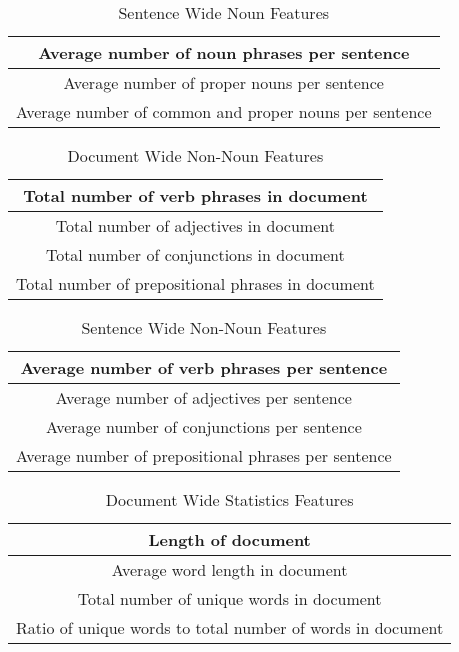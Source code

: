\documentclass[]{article}
\begin{document}
\begin{table}[!htbp]
	\begin{center}
		\begin{tabular}{| c |} \hline
      Average number of noun phrases per sentence \\ \hline
			Average number of proper nouns per sentence \\ \hline
			Average number of common and proper nouns per sentence \\ \hline
		\end{tabular}
	\end{center}
	\caption{Sentence Wide Noun Features}
	\label{table:group2}
\end{table}

\begin{table}[!htbp]
	\begin{center}
		\begin{tabular}{| c |} \hline
			Total number of verb phrases in document \\ \hline
			Total number of adjectives in document \\ \hline
			Total number of conjunctions in document \\ \hline
			Total number of prepositional phrases in document \\ \hline
		\end{tabular}
	\end{center}
	\caption{Document Wide Non-Noun Features}
	\label{table:group3}
\end{table}

\begin{table}[!htbp]
	\begin{center}
		\begin{tabular}{| c |} \hline
			Average number of verb phrases per sentence \\ \hline
			Average number of adjectives per sentence \\  \hline
			Average number of conjunctions per sentence \\ \hline
			Average number of prepositional phrases per sentence \\ \hline
		\end{tabular}
	\end{center}
	\caption{Sentence Wide Non-Noun Features}
	\label{table:group4}
\end{table}

\begin{table}[!htbp]
	\begin{center}
		\begin{tabular}{| c |} \hline
      Length of document \\ \hline
			Average word length in document \\ \hline
      Total number of unique words in document \\ \hline
      Ratio of unique words to total number of words in document \\ \hline
		\end{tabular}
	\end{center}
	\caption{Document Wide Statistics Features}
	\label{table:group5}
\end{table}
\end{document}
